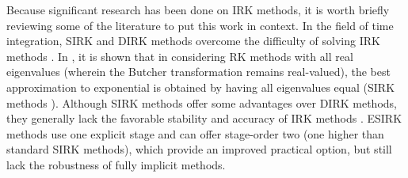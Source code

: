 \documentclass[review]{siamart}
\begin{document}
Because significant research has been done on IRK methods, it is worth briefly
reviewing some of the literature to put this work in context. In the field of time
integration, SIRK and DIRK methods overcome the difficulty of solving IRK methods
\cite{alexander1977diagonally,norsett1976runge}.
In \cite{orel91}, it is shown that in considering RK methods with all real eigenvalues
(wherein the Butcher transformation \cite{butcher76} remains real-valued), the best
approximation to exponential is obtained by having all eigenvalues equal (SIRK
methods \cite{norsett1976runge}).
Although SIRK methods offer some advantages over DIRK methods, they generally lack
the favorable stability and accuracy of IRK methods \cite{orel91}. ESIRK methods
use one explicit stage and can offer stage-order two \cite{butcher00} (one higher
than standard SIRK methods), which provide an improved practical option, but still
lack the robustness of fully implicit methods.






\end{document}
